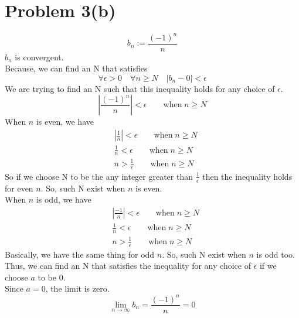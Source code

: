 \documentclass{article}
\begin{document}
\section*{Problem 3(b)}
\[
   b_n := \frac{(-1)^n}{n}
\]
\(b_n\) is convergent.\\
Because, we can find an N that satisfies
\[
   \forall \epsilon > 0 \quad \forall n \geq N \quad |b_n - 0| < \epsilon
\]
We are trying to find an N such that this inequality holds for any choice of \(\epsilon\).\\
\[
   |\frac{(-1)^n}{n}| < \epsilon \qquad \text{when} \; n \geq N
\]
When \(n\) is even, we have
\begin{align*}
   & |\frac{1}{n}| < \epsilon \qquad \text{when} \; n \geq N \\
   & \frac{1}{n} < \epsilon \qquad \text{when} \; n \geq N \\
   & n > \frac{1}{\epsilon} \qquad \text{when} \; n \geq N
\end{align*}
So if we choose N to be the any integer greater than \(\frac{1}{\epsilon}\) then the inequality holds for even \(n\). So, such N exist when \(n\) is even. \\
When \(n\) is odd, we have
\begin{align*}
   & |\frac{-1}{n}| < \epsilon \qquad \text{when} \; n \geq N \\
   & \frac{1}{n} < \epsilon \qquad \text{when} \; n \geq N \\
   & n > \frac{1}{\epsilon} \qquad \text{when} \; n \geq N
\end{align*}
Basically, we have the same thing for odd \(n\). So, such N exist when \(n\) is odd too. \\
Thus, we can find an N that satisfies the inequality for any choice of \(\epsilon\) if we choose \(a\) to be 0.\\
Since \(a = 0\), the limit is zero.\\
\[
   \lim_{n \to \infty} b_n = \frac{(-1)^n}{n} = 0
\]
\end{document}
